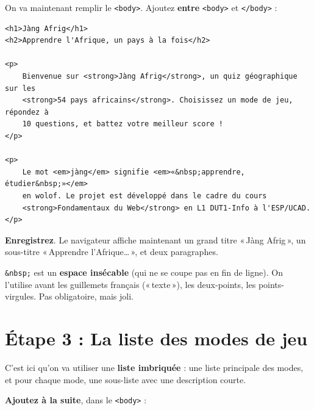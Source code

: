 \documentclass[11pt,a4paper]{article}
\newcommand{\cmark}{\ding{51}}
\begin{document}
On va maintenant remplir le \texttt{<body>}. Ajoutez \textbf{entre}
\texttt{<body>} et \texttt{</body>} :

\begin{lstlisting}[language=HTML5]
<h1>Jàng Afrig</h1>
<h2>Apprendre l'Afrique, un pays à la fois</h2>

<p>
    Bienvenue sur <strong>Jàng Afrig</strong>, un quiz géographique sur les
    <strong>54 pays africains</strong>. Choisissez un mode de jeu, répondez à
    10 questions, et battez votre meilleur score !
</p>

<p>
    Le mot <em>jàng</em> signifie <em>«&nbsp;apprendre, étudier&nbsp;»</em>
    en wolof. Le projet est développé dans le cadre du cours
    <strong>Fondamentaux du Web</strong> en L1 DUT1-Info à l'ESP/UCAD.
</p>
\end{lstlisting}

\textbf{Enregistrez}. Le navigateur affiche maintenant un grand titre
«\,Jàng Afrig\,», un sous-titre «\,Apprendre l'Afrique\ldots\,», et deux
paragraphes. \cmark

\begin{infobox}
\texttt{\&nbsp;} est un \textbf{espace insécable} (qui ne se coupe pas en
fin de ligne). On l'utilise avant les guillemets français
(«\,texte\,»), les deux-points, les points-virgules. Pas obligatoire,
mais joli.
\end{infobox}

\newpage

\section{Étape 3 : La liste des modes de jeu}

C'est ici qu'on va utiliser une \textbf{liste imbriquée} : une liste
principale des modes, et pour chaque mode, une sous-liste avec une
description courte.

\textbf{Ajoutez à la suite}, dans le \texttt{<body>} :
\end{document}
